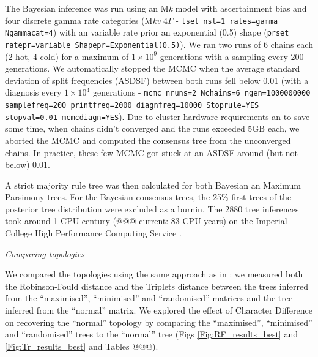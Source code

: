 \documentclass[12pt,letterpaper]{article}
\renewcommand{\subsection}[1]{%
\bigskip
\begin{center}
\begin{large}
\normalfont\itshape #1
\end{large}
\end{center}}
\begin{document}
The Bayesian inference was run using an M\textit{k} model with ascertainment bias and four discrete gamma rate categories (M\textit{kv} $4\Gamma$ - \texttt{lset nst=1 rates=gamma Ngammacat=4}) with an variable rate prior an exponential (0.5) shape (\texttt{prset ratepr=variable Shapepr=Exponential(0.5)}).
We ran two runs of 6 chains each (2 hot, 4 cold) for a maximum of $1\times10^9$ generations with a sampling every 200 generations.
We automatically stopped the MCMC when the average standard deviation of split frequencies (ASDSF) between both runs fell below 0.01 (with a diagnosis every $1\times10^4$ generations - \texttt{mcmc nruns=2 Nchains=6 ngen=1000000000 samplefreq=200 printfreq=2000 diagnfreq=10000 Stoprule=YES stopval=0.01 mcmcdiagn=YES}).
Due to cluster hardware requirements an to save some time, when chains didn't converged and the runs exceeded 5GB each, we aborted the MCMC and computed the consensus tree from the unconverged chains.
In practice, these few MCMC got stuck at an ASDSF around (but not below) 0.01.

A strict majority rule tree was then calculated for both Bayesian an Maximum Parsimony trees.
For the Bayesian consensus trees, the 25\% first trees of the posterior tree distribution were excluded as a burnin.
The 2880 tree inferences took around 1 CPU century (@@@ current: 83 CPU years) on the Imperial College High Performance Computing Service \citep[2-3GHz clock rate;][]{HPC}.

\subsection{Comparing topologies}
We compared the topologies using the same approach as in \cite{Guillerme2016146}: we measured both the Robinson-Fould distance \citep{RF1981} and the Triplets distance \citep{dobson1975triplets} between the trees inferred from the ``maximised'', ``minimised'' and ``randomised'' matrices and the tree inferred from the ``normal'' matrix.
We explored the effect of Character Difference on recovering the ``normal'' topology by comparing the ``maximised'', ``minimised'' and ``randomised'' trees to the ``normal'' tree (Figs \ref{Fig:RF_results_best} and \ref{Fig:Tr_results_best} and Tables @@@).
\end{document}
